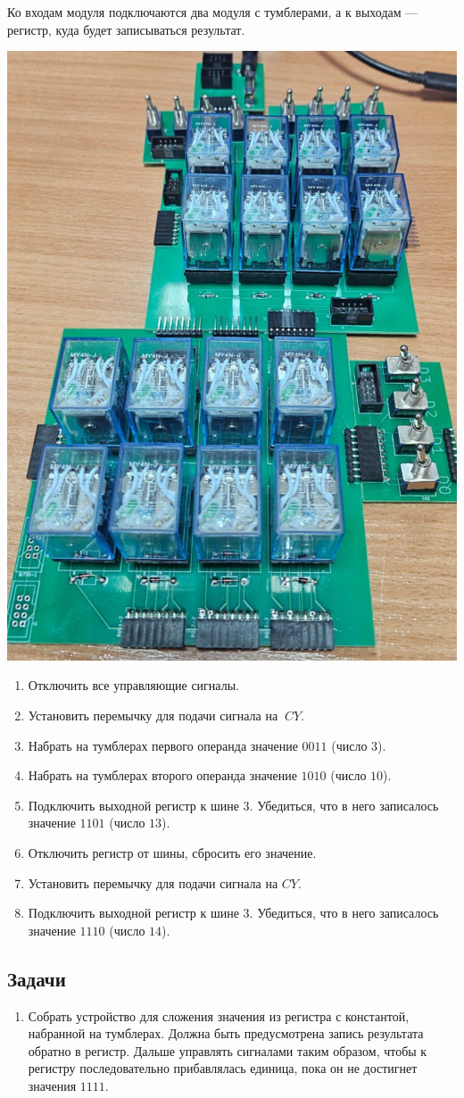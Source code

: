 Ко входам модуля подключаются два модуля с тумблерами, а к выходам --- регистр,
куда будет записываться результат.

\includegraphics[width=0.5\columnwidth]{photo/adder.jpg}

\begin{enumerate}
    \item Отключить все управляющие сигналы.
    \item Установить перемычку для подачи сигнала на $~CY$.
    \item Набрать на тумблерах первого операнда значение $0011$ (число $3$).
    \item Набрать на тумблерах второго операнда значение $1010$ (число $10$).
    \item Подключить выходной регистр к шине $3$. Убедиться, что в него записалось значение $1101$ (число $13$).
    \item Отключить регистр от шины, сбросить его значение.
    \item Установить перемычку для подачи сигнала на $CY$.
    \item Подключить выходной регистр к шине $3$. Убедиться, что в него записалось значение $1110$ (число $14$).
\end{enumerate}


\subsection{Задачи}

\begin{enumerate}
    \item Собрать устройство для сложения значения из регистра с константой, набранной на тумблерах.
          Должна быть предусмотрена запись результата обратно в регистр.
          Дальше управлять сигналами таким образом, чтобы к регистру последовательно
          прибавлялась единица, пока он не достигнет значения $1111$.
\end{enumerate}



